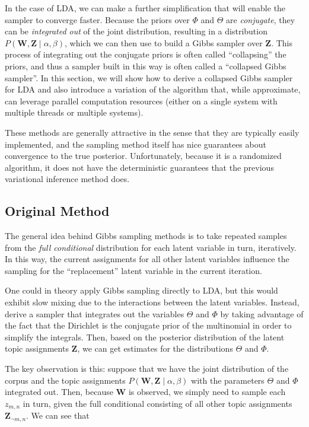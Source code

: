 \documentclass[11pt]{article}
\begin{document}
In the case of LDA, we can make a further simplification that will enable
the sampler to converge faster. Because the priors over $\Phi$ and $\Theta$
are \emph{conjugate}, they can be \emph{integrated out} of the joint
distribution, resulting in a distribution $P(\mathbf{W}, \mathbf{Z} \mid
\alpha, \beta)$, which we can then use to build a Gibbs sampler over
$\mathbf{Z}$. This process of integrating out the conjugate priors is often
called ``collapsing'' the priors, and thus a sampler built in this way is
often called a ``collapsed Gibbs sampler''. In this section, we will show
how to derive a collapsed Gibbs sampler for LDA and also introduce a
variation of the algorithm that, while approximate, can leverage parallel
computation resources (either on a single system with multiple threads or
multiple systems).

These methods are generally attractive in the sense that they are typically
easily implemented, and the sampling method itself has nice guarantees
about convergence to the true posterior. Unfortunately, because it is a
randomized algorithm, it does not have the deterministic guarantees that
the previous variational inference method does.

\label{sec:cgs}
\subsection{Original Method}
The general idea behind Gibbs sampling methods is to take repeated samples
from the \emph{full conditional} distribution for each latent variable in
turn, iteratively. In this way, the current assignments for all other
latent variables influence the sampling for the ``replacement'' latent
variable in the current iteration.

One could in theory apply Gibbs sampling directly to LDA, but this would
exhibit slow mixing due to the interactions between the latent variables.
Instead, \citet{Griffiths:2004:Topics} derive a sampler that integrates out
the variables $\Theta$ and $\Phi$ by taking advantage of the fact that the
Dirichlet is the conjugate prior of the multinomial in order to simplify
the integrals. Then, based on the posterior distribution of the latent
topic assignments $\mathbf{Z}$, we can get estimates for the distributions
$\Theta$ and $\Phi$.

The key observation is this: suppose that we have the joint distribution of
the corpus and the topic assignments $P(\mathbf{W}, \mathbf{Z} \mid \alpha,
\beta)$ with the parameters $\Theta$ and $\Phi$ integrated out. Then,
because $\mathbf{W}$ is observed, we simply need to sample each $z_{m,n}$
in turn, given the full conditional consisting of all other topic
assignments $\mathbf{Z}_{\neg m,n}$. We can see that
\end{document}
